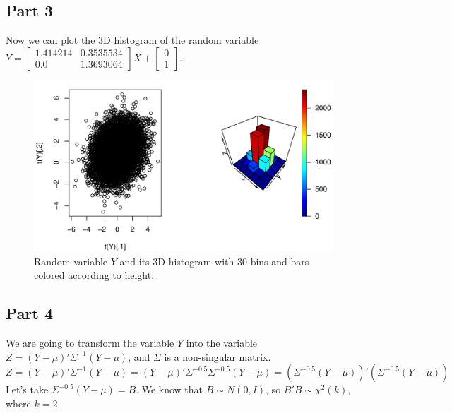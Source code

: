\documentclass[12pt, a4paper]{article}\usepackage[]{graphicx}\usepackage[]{color}
\makeatletter
\def\maxwidth{ %
  \ifdim\Gin@nat@width>\linewidth
    \linewidth
  \else
    \Gin@nat@width
  \fi
}
\newenvironment{knitrout}{}{} %
\makeatother
\begin{document}
\subsection{Part 3}
Now we can plot the 3D histogram of the random variable $Y = \left[\begin{matrix} 1.414214 & 0.3535534 \\ 0.0 & 1.3693064 \end{matrix} \right]X+\left[\begin{matrix}0\\1\end{matrix}\right]$.
\begin{knitrout}
\color{fgcolor}\begin{figure}[H]

{\centering \includegraphics[width=\maxwidth]{figure/ex2_3hist3d-1} 

}

\caption[Random variable $Y$ and its 3D histogram with 30 bins and bars colored according to height]{Random variable $Y$ and its 3D histogram with 30 bins and bars colored according to height.}\label{fig:ex2.3hist3d}
\end{figure}


\end{knitrout}

\subsection{Part 4}
We are going to transform the variable $Y$ into the variable $Z= (Y-\mu)' \Sigma^{-1} (Y-\mu)$, and $\Sigma$ is a non-singular matrix.
\[
Z = (Y-\mu)' \Sigma^{-1} (Y-\mu) = (Y-\mu)' \Sigma^{-0.5} \Sigma^{-0.5} (Y-\mu) = \left(\Sigma^{-0.5} (Y-\mu)\right)' \left(\Sigma^{-0.5} (Y-\mu)\right)
\]
Let's take $\Sigma^{-0.5} (Y-\mu) = B$. We know that $B \sim N(0,I)$, so $B'B \sim \chi^2(k)$, where $k=2$.
\end{document}
